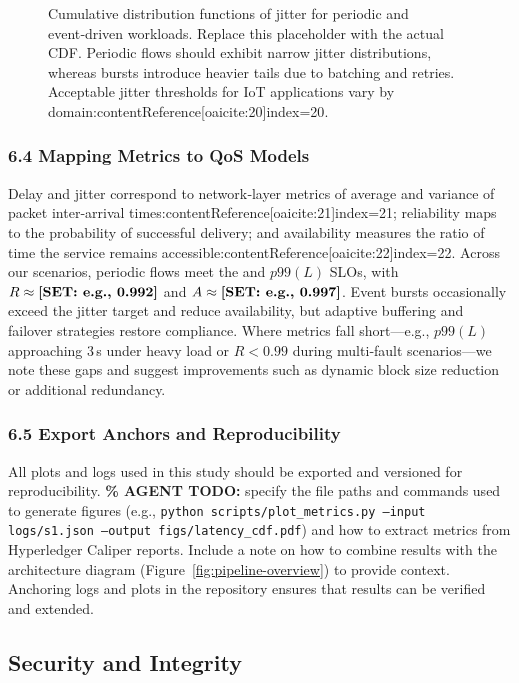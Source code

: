 \begin{figure}[!t]
  \centering
  \caption{Cumulative distribution functions of jitter for periodic and event‑driven workloads.  Replace this placeholder with the actual CDF.  Periodic flows should exhibit narrow jitter distributions, whereas bursts introduce heavier tails due to batching and retries.  Acceptable jitter thresholds for IoT applications vary by domain:contentReference[oaicite:20]{index=20}.}
  \label{fig:jitter-cdf}
\end{figure}

\subsubsection{6.4 Mapping Metrics to QoS Models}
\label{sec:qos-mapping}
Delay and jitter correspond to network‑layer metrics of average and variance of packet inter‑arrival times:contentReference[oaicite:21]{index=21}; reliability maps to the probability of successful delivery; and availability measures the ratio of time the service remains accessible:contentReference[oaicite:22]{index=22}.  Across our scenarios, periodic flows meet the \SLOpL{} and $p99(L)$ SLOs, with $R\approx\textbf{[SET: e.g., 0.992]}$ and $A\approx\textbf{[SET: e.g., 0.997]}$.  Event bursts occasionally exceed the jitter target and reduce availability, but adaptive buffering and failover strategies restore compliance.  Where metrics fall short—e.g., $p99(L)$ approaching 3 s under heavy load or $R<0.99$ during multi‑fault scenarios—we note these gaps and suggest improvements such as dynamic block size reduction or additional redundancy.

\subsubsection{6.5 Export Anchors and Reproducibility}
\label{sec:anchors-export}
All plots and logs used in this study should be exported and versioned for reproducibility.  \textbf{\% AGENT TODO:} specify the file paths and commands used to generate figures (e.g., \texttt{python scripts/plot\_metrics.py --input logs/s1.json --output figs/latency\_cdf.pdf}) and how to extract metrics from Hyperledger Caliper reports.  Include a note on how to combine results with the architecture diagram (Figure~\ref{fig:pipeline-overview}) to provide context.  Anchoring logs and plots in the repository ensures that results can be verified and extended.


\subsection{Security and Integrity}

